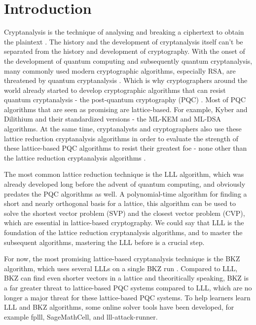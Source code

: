 \documentclass[runningheads]{llncs}
\begin{document}
\section{Introduction}

Cryptanalysis is the technique of analysing and breaking a ciphertext to obtain the plaintext \cite{1}. The history and the development of cryptanalysis itself can't be separated from the history and development of cryptography. With the onset of the development of quantum computing and subsequently quantum cryptanalysis, many commonly used modern cryptographic algorithms, especially RSA, are threatened by quantum cryptanalysis \cite{2}. Which is why cryptographers around the world already started to develop cryptographic algorithms that can resist quantum cryptanalysis - the post-quantum cryptography (PQC) \cite{2}. Most of PQC algorithms that are seen as promising are lattice-based. For example, Kyber and Dilithium and their standardized versions - the ML-KEM and ML-DSA algorithms. At the same time, cryptanalysts and cryptographers also use these lattice reduction cryptanalysis algorithms in order to evaluate the strength of these lattice-based PQC algorithms to resist their greatest foe - none other than the lattice reduction cryptanalysis algorithms \cite{3}.

The most common lattice reduction technique is the LLL algorithm, which was already developed long before the advent of quantum computing, and obviously predates the PQC algorithms as well. A polynomial-time algorithm for finding a short and nearly orthogonal basis for a lattice, this algorithm can be used to solve the shortest vector problem (SVP) and the closest vector problem (CVP), which are essential in lattice-based cryptography. We could say that LLL is the foundation of the lattice reduction cryptanalysis algorithms, and to master the subsequent algorithms, mastering the LLL before is a crucial step. 

For now, the most promising lattice-based cryptanalysis technique is the BKZ algorithm, which uses several LLLs on a single BKZ run \cite{4}. Compared to LLL, BKZ can find even shorter vectors in a lattice and theoritically speaking, BKZ is a far greater threat to lattice-based PQC systems compared to LLL, which are no longer a major threat for these lattice-based PQC systems. To help learners learn LLL and BKZ algorithms, some online solver tools have been developed, for example fplll, SageMathCell, and lll-attack-runner. 
\end{document}
